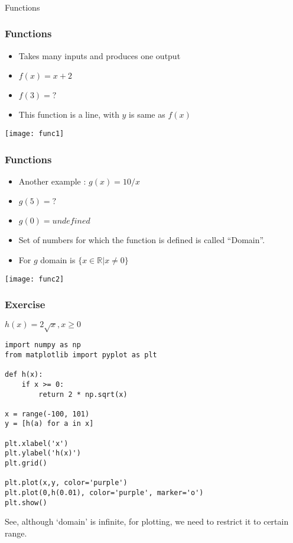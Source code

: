 \begin{frame}[fragile]\frametitle{}
\begin{center}
{\Large Functions}
\end{center}
\end{frame}

 \begin{frame}[fragile]\frametitle{Functions}
\begin{itemize}
\item Takes many inputs and produces one output
\item $f(x) = x + 2$
\item $f(3)=?$
\item This function is a line, with $y$ is same as $f(x)$
\end{itemize}
\begin{center}
\texttt{[image: func1]}
\end{center}
\end{frame}

 \begin{frame}[fragile]\frametitle{Functions}
\begin{itemize}
\item Another example : $g(x) = 10/x$
\item $g(5)=?$
\item $g(0)=undefined$
\item Set of numbers for which the function is defined is called ``Domain''.
\item For $g$ domain is $\{x \in \mathbb{R} | x \neq 0\}$
\end{itemize}
\begin{center}
\texttt{[image: func2]}
\end{center}
\end{frame}

 \begin{frame}[fragile]\frametitle{Exercise}
$h(x) = 2 \sqrt{x}, x \geq 0$

\begin{lstlisting}
import numpy as np
from matplotlib import pyplot as plt

def h(x):
    if x >= 0:
        return 2 * np.sqrt(x)

x = range(-100, 101)
y = [h(a) for a in x]

plt.xlabel('x')
plt.ylabel('h(x)')
plt.grid()

plt.plot(x,y, color='purple')
plt.plot(0,h(0.01), color='purple', marker='o')
plt.show()
\end{lstlisting}
See, although `domain' is infinite, for plotting, we need to restrict it to certain range.
\end{frame}

